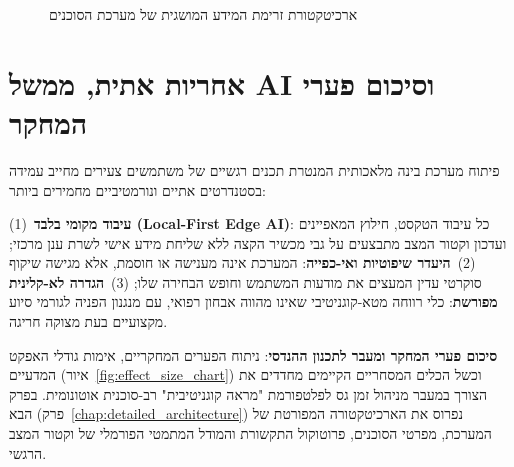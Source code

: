 \begin{figure}[H]
\begin{LTR}
\end{LTR}
\caption{ארכיטקטורת זרימת המידע המושגית של מערכת הסוכנים \projectname{}}
\label{fig:multiagent_architecture}
\end{figure}

\section{אחריות אתית, ממשל AI וסיכום פערי המחקר}
\label{sec:gaps_ethics}
פיתוח מערכת בינה מלאכותית המנטרת תכנים רגשיים של משתמשים צעירים מחייב עמידה בסטנדרטים אתיים ונורמטיביים מחמירים ביותר:

\begin{ethicsbox}
(1)~\textbf{עיבוד מקומי בלבד (\textenglish{Local-First Edge AI})}: כל עיבוד הטקסט, חילוץ המאפיינים ועדכון וקטור המצב מתבצעים על גבי מכשיר הקצה ללא שליחת מידע אישי לשרת ענן מרכזי;
(2)~\textbf{היעדר שיפוטיות ואי-כפייה}: המערכת אינה מענישה או חוסמת, אלא מגישה שיקוף סוקרטי עדין המעצים את מודעות המשתמש וחופש הבחירה שלו;
(3)~\textbf{הגדרה לא-קלינית מפורשת}: כלי רווחה מטא-קוגניטיבי שאינו מהווה אבחון רפואי, עם מנגנון הפניה לגורמי סיוע מקצועיים בעת מצוקה חריגה.
\end{ethicsbox}

\noindent
\textbf{סיכום פערי המחקר ומעבר לתכנון ההנדסי}: ניתוח הפערים המחקריים, אימות גודלי האפקט המדעיים (איור~\ref{fig:effect_size_chart}) וכשל הכלים המסחריים הקיימים מחדדים את הצורך במעבר מניהול זמן גס לפלטפורמת "מראה קוגניטיבית" רב-סוכנית אוטונומית. בפרק הבא (פרק~\ref{chap:detailed_architecture}) נפרוס את הארכיטקטורה המפורטת של המערכת, מפרטי הסוכנים, פרוטוקול התקשורת והמודל המתמטי הפורמלי של וקטור המצב הרגשי.
